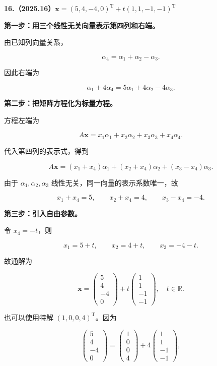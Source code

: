 \documentclass[UTF8,11pt,fontset=windows]{ctexart}
\begin{document}
\textbf{16.（2025.16）$\boldsymbol x=(5,4,-4,0)^{\mathrm T}+t(1,1,-1,-1)^{\mathrm T}$}

\textbf{第一步：用三个线性无关向量表示第四列和右端。}

由已知列向量关系，

$$
\alpha_4=\alpha_1+\alpha_2-\alpha_3.
$$

因此右端为

$$
\alpha_1+4\alpha_4
=5\alpha_1+4\alpha_2-4\alpha_3.
$$

\textbf{第二步：把矩阵方程化为标量方程。}

方程左端为

$$
A\boldsymbol x=x_1\alpha_1+x_2\alpha_2+x_3\alpha_3+x_4\alpha_4.
$$

代入第四列的表示式，得到

$$
A\boldsymbol x=(x_1+x_4)\alpha_1+(x_2+x_4)\alpha_2+(x_3-x_4)\alpha_3.
$$

由于 $\alpha_1,\alpha_2,\alpha_3$ 线性无关，同一向量的表示系数唯一，故

$$
x_1+x_4=5,\qquad x_2+x_4=4,\qquad x_3-x_4=-4.
$$

\textbf{第三步：引入自由参数。}

令 $x_4=-t$，则

$$
x_1=5+t,\qquad x_2=4+t,\qquad x_3=-4-t.
$$

故通解为

$$
\boxed{\boldsymbol x=
\begin{pmatrix}5\\4\\-4\\0\end{pmatrix}
+t\begin{pmatrix}1\\1\\-1\\-1\end{pmatrix},\quad t\in\mathbb R}.
$$

也可以使用特解 $(1,0,0,4)^{\mathrm T}$。因为

$$
\begin{pmatrix}5\\4\\-4\\0\end{pmatrix}
=\begin{pmatrix}1\\0\\0\\4\end{pmatrix}
+4\begin{pmatrix}1\\1\\-1\\-1\end{pmatrix},
$$
\end{document}

